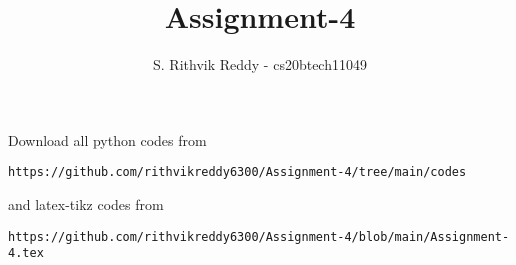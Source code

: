 \documentclass[journal,12pt,twocolumn]{IEEEtran}
\DeclareMathOperator*{\Res}{Res}
\begin{document}
\newcommand{\BEQA}{\begin{eqnarray}}
\newcommand{\EEQA}{\end{eqnarray}}
\newcommand{\define}{\stackrel{\triangle}{=}}

\raggedbottom
\setlength{\parindent}{0pt}
\providecommand{\mbf}{\mathbf}
\providecommand{\pr}[1]{\ensuremath{\Pr\left(#1\right)}}
\providecommand{\qfunc}[1]{\ensuremath{Q\left(#1\right)}}
\providecommand{\sbrak}[1]{\ensuremath{{}\left[#1\right]}}
\providecommand{\lsbrak}[1]{\ensuremath{{}\left[#1\right.}}
\providecommand{\rsbrak}[1]{\ensuremath{{}\left.#1\right]}}
\providecommand{\brak}[1]{\ensuremath{\left(#1\right)}}
\providecommand{\lbrak}[1]{\ensuremath{\left(#1\right.}}
\providecommand{\rbrak}[1]{\ensuremath{\left.#1\right)}}
\providecommand{\cbrak}[1]{\ensuremath{\left\{#1\right\}}}
\providecommand{\lcbrak}[1]{\ensuremath{\left\{#1\right.}}
\providecommand{\rcbrak}[1]{\ensuremath{\left.#1\right\}}}
\theoremstyle{remark}
\newtheorem{rem}{Remark}
\newcommand{\sgn}{\mathop{\mathrm{sgn}}}
\providecommand{\abs}[1]{\vert#1\vert}
\providecommand{\res}[1]{\Res\displaylimits_{#1}} 
\providecommand{\norm}[1]{\lVert#1\rVert}
\providecommand{\mtx}[1]{\mathbf{#1}}
\providecommand{\mean}[1]{E[ #1 ]}
\providecommand{\fourier}{\overset{\mathcal{F}}{ \rightleftharpoons}}
\providecommand{\system}{\overset{\mathcal{H}}{ \longleftrightarrow}}
\newcommand{\solution}{\noindent \textbf{Solution: }}
\newcommand{\cosec}{\,\text{cosec}\,}
\providecommand{\dec}[2]{\ensuremath{\overset{#1}{\underset{#2}{\gtrless}}}}
\newcommand{\myvec}[1]{\ensuremath{\begin{pmatrix}#1\end{pmatrix}}}
\newcommand{\mydet}[1]{\ensuremath{\begin{vmatrix}#1\end{vmatrix}}}
\makeatletter
{}
\makeatother
\let\StandardTheFigure\thefigure
\let\vec\mathbf
\renewcommand{\thefigure}{\theproblem}
\def\putbox#1#2#3{\makebox[0in][l]{\makebox[#1][l]{}\raisebox{\baselineskip}[0in][0in]{\raisebox{#2}[0in][0in]{#3}}}}
     \def\rightbox#1{\makebox[0in][r]{#1}}
     \def\centbox#1{\makebox[0in]{#1}}
     \def\topbox#1{\raisebox{-\baselineskip}[0in][0in]{#1}}
     \def\midbox#1{\raisebox{-0.5\baselineskip}[0in][0in]{#1}}
\vspace{3cm}
\title{Assignment-4}
\author{S. Rithvik Reddy - cs20btech11049}
\maketitle
\newpage
\bigskip
\renewcommand{\thefigure}{\theenumi}
\renewcommand{\thetable}{\theenumi}
Download all python codes from 
\begin{lstlisting}
https://github.com/rithvikreddy6300/Assignment-4/tree/main/codes
\end{lstlisting}
%
and latex-tikz codes from 
%
\begin{lstlisting}
https://github.com/rithvikreddy6300/Assignment-4/blob/main/Assignment-4.tex
\end{lstlisting}
\end{document}

